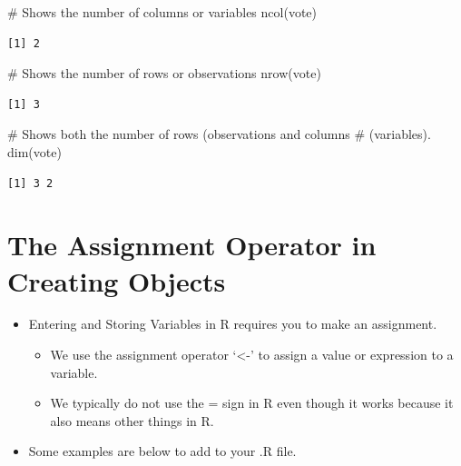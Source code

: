 \documentclass[
  letterpaper,
  DIV=11,
  numbers=noendperiod]{scrreprt}
\newenvironment{Shaded}{\begin{snugshade}}{\end{snugshade}}
\newcommand{\CommentTok}[1]{\textcolor[rgb]{0.37,0.37,0.37}{#1}}
\newcommand{\FunctionTok}[1]{\textcolor[rgb]{0.28,0.35,0.67}{#1}}
\newcommand{\NormalTok}[1]{\textcolor[rgb]{0.00,0.23,0.31}{#1}}
\providecommand{\tightlist}{%
  \setlength{\itemsep}{0pt}\setlength{\parskip}{0pt}}\usepackage{longtable,booktabs,array}
\begin{document}
\begin{Shaded}
\begin{Highlighting}[]
\CommentTok{\# Shows the number of columns or variables}
\FunctionTok{ncol}\NormalTok{(vote)}
\end{Highlighting}
\end{Shaded}

\begin{verbatim}
[1] 2
\end{verbatim}

\begin{Shaded}
\begin{Highlighting}[]
\CommentTok{\# Shows the number of rows or observations}
\FunctionTok{nrow}\NormalTok{(vote)}
\end{Highlighting}
\end{Shaded}

\begin{verbatim}
[1] 3
\end{verbatim}

\begin{Shaded}
\begin{Highlighting}[]
\CommentTok{\# Shows both the number of rows (observations and columns}
\CommentTok{\# (variables).}
\FunctionTok{dim}\NormalTok{(vote)}
\end{Highlighting}
\end{Shaded}

\begin{verbatim}
[1] 3 2
\end{verbatim}

\section{The Assignment Operator in Creating
Objects}\label{the-assignment-operator-in-creating-objects}

\begin{itemize}
\tightlist
\item
  Entering and Storing Variables in R requires you to make an
  assignment.

  \begin{itemize}
  \tightlist
  \item
    We use the assignment operator `\textless-' to assign a value or
    expression to a variable.
  \item
    We typically do not use the = sign in R even though it works because
    it also means other things in R.
  \end{itemize}
\item
  Some examples are below to add to your .R file.
\end{itemize}
\end{document}
